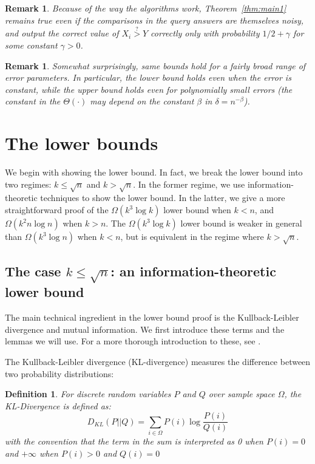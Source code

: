 \documentclass[12pt]{article}
\newtheorem{remark}[theorem]{Remark}
\newtheorem{mydef}[theorem]{Definition}
\newcommand{\Ta}{\Theta}
\newcommand{\Om}{\Omega}
\begin{document}
\begin{remark}
Because of the way the algorithms work, Theorem~\ref{thm:main1} remains true even if the comparisons in the query answers are themselves noisy, 
and output the correct value of $X_i\stackrel{?}{>}Y$ correctly only with probability $1/2+\gamma$ for some constant $\gamma>0$. 
\end{remark}

\begin{remark}
Somewhat surprisingly, same bounds hold for a fairly broad range of error parameters. In particular, the lower bound holds even when the error is constant, while the upper bound
holds even for polynomially small errors (the constant in the $\Ta(\cdot)$ may depend on the constant $\beta$ in $\delta = n^{-\beta}$). 
\end{remark}



\section{The lower bounds}




We begin with showing the lower bound. In fact, we break the lower bound into two regimes: $k\le \sqrt{n}$ and $k>\sqrt{n}$. In 
the former regime, we use information-theoretic techniques to show the lower bound. In the latter, we give a more straightforward
proof of the $\Omega(k^3\log k)$ lower bound when $k<n$, and $\Om(k^2 n \log n)$ when $k>n$. The  $\Omega(k^3\log k)$
lower bound is weaker in general than  $\Omega(k^3\log n)$ when $k<n$, but is equivalent in the regime where $k>\sqrt{n}$. 


\subsection{The case $k\le \sqrt{n}$: an information-theoretic lower bound} \label{sec:lowerbound}


The main technical ingredient in the lower bound proof is the Kullback-Leibler divergence and mutual information. We first introduce these terms and the lemmas we will use. For a more thorough introduction to these, see \cite{Cover}.

The Kullback-Leibler divergence (KL-divergence) measures the difference between two probability distributions:
\begin{mydef} 
For discrete random variables $P$ and $Q$ over sample space $\Omega$, the KL-Divergence is defined as: $$D_{KL}(P||Q) = \sum_{i \in \Omega} P(i) \log{\frac{P(i)}{Q(i)}}$$ with the convention that the term in the sum is interpreted as 0 when $P(i) = 0$ and $+\infty$ when $P(i) > 0$ and $Q(i) = 0$ 
\end{mydef}
\end{document}
